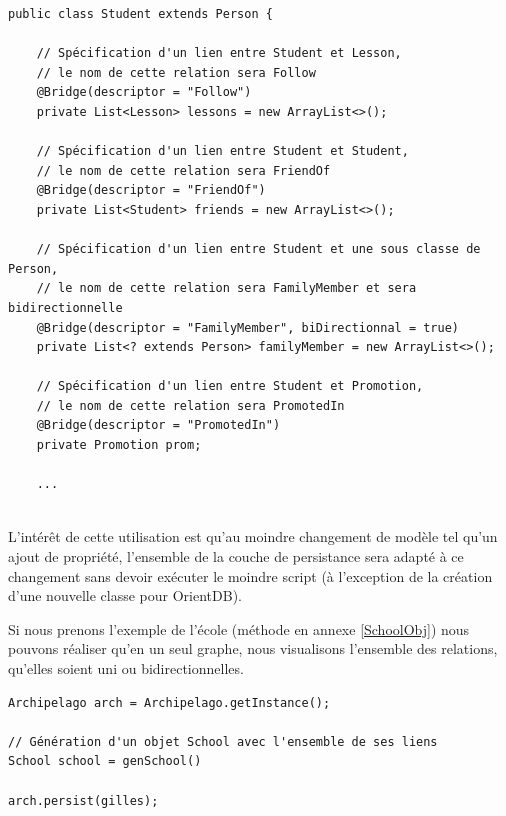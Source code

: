 \documentclass[a4paper,fleqn,12pt,oneside]{report}
\begin{document}
\begin{lstlisting}
public class Student extends Person {

    // Spécification d'un lien entre Student et Lesson, 
    // le nom de cette relation sera Follow
    @Bridge(descriptor = "Follow")
    private List<Lesson> lessons = new ArrayList<>();

    // Spécification d'un lien entre Student et Student, 
    // le nom de cette relation sera FriendOf
    @Bridge(descriptor = "FriendOf")
    private List<Student> friends = new ArrayList<>();
    
    // Spécification d'un lien entre Student et une sous classe de Person, 
    // le nom de cette relation sera FamilyMember et sera bidirectionnelle
    @Bridge(descriptor = "FamilyMember", biDirectionnal = true)
    private List<? extends Person> familyMember = new ArrayList<>();
    
    // Spécification d'un lien entre Student et Promotion, 
    // le nom de cette relation sera PromotedIn
    @Bridge(descriptor = "PromotedIn")
    private Promotion prom;
    
    ...
    
\end{lstlisting}

L'intérêt de cette utilisation est qu'au moindre changement de modèle tel qu'un ajout de propriété, l'ensemble de la couche de persistance sera adapté à ce changement sans devoir exécuter le moindre script (à l'exception de la création d'une nouvelle classe pour OrientDB).

Si nous prenons l'exemple de l'école (méthode en annexe \ref{SchoolObj}) nous pouvons réaliser qu'en un seul graphe, nous visualisons l'ensemble des relations, qu'elles soient uni ou bidirectionnelles.
\newpage

\begin{lstlisting}
Archipelago arch = Archipelago.getInstance();

// Génération d'un objet School avec l'ensemble de ses liens
School school = genSchool()

arch.persist(gilles);
\end{lstlisting}
\end{document}

